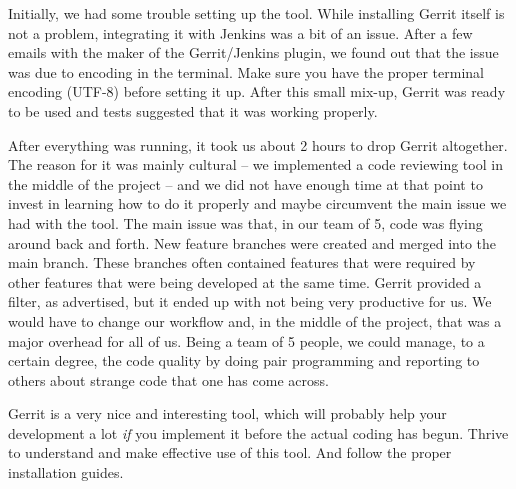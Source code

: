 Initially, we had some trouble setting up the tool. While installing Gerrit itself is not a problem, integrating it with Jenkins was a bit of an issue. After a few emails with the maker of the Gerrit/Jenkins plugin, we found out that the issue was due to encoding in the terminal. Make sure you have the proper terminal encoding (UTF-8) before setting it up. After this small mix-up, Gerrit was ready to be used and tests suggested that it was working properly.

After everything was running, it took us about 2 hours to drop Gerrit altogether. The reason for it was mainly cultural -- we implemented a code reviewing tool in the middle of the project -- and we did not have enough time at that point to invest in learning how to do it properly and maybe circumvent the main issue we had with the tool. The main issue was that, in our team of 5, code was flying around back and forth. New feature branches were created and merged into the main branch. These branches often contained features that were required by other features that were being developed at the same time. Gerrit provided a filter, as advertised, but it ended up with not being very productive for us. We would have to change our workflow and, in the middle of the project, that was a major overhead for all of us. Being a team of 5 people, we could manage, to a certain degree, the code quality by doing pair programming and reporting to others about strange code that one has come across.

Gerrit is a very nice and interesting tool, which will probably help your development a lot \emph{if} you implement it before the actual coding has begun. Thrive to understand and make effective use of this tool. And follow the proper installation guides.
